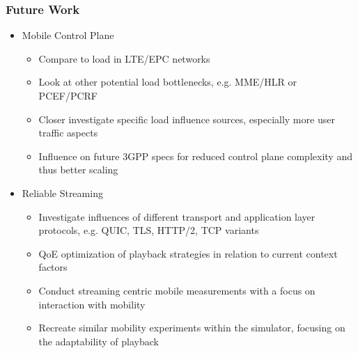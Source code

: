 \documentclass{beamer}
\begin{document}
\begin{frame}
	\frametitle{Future Work}

	\begin{itemize}
		\item Mobile Control Plane
			\begin{itemize}
				\item Compare to load in LTE/EPC networks
				\item Look at other potential load bottlenecks, e.g. MME/HLR or PCEF/PCRF
				\item Closer investigate specific load influence sources, especially more user traffic aspects
				\item Influence on future 3GPP specs for reduced control plane complexity and thus better scaling
			\end{itemize}
		\item Reliable Streaming
		\begin{itemize}
			\item Investigate influences of different transport and application layer protocols, e.g. QUIC, TLS, HTTP/2, TCP variants
			\item QoE optimization of playback strategies in relation to current context factors
			\item Conduct streaming centric mobile measurements with a focus on interaction with mobility
			\item Recreate similar mobility experiments within the simulator, focusing on the adaptability of playback 
		\end{itemize}
	\end{itemize}

\end{frame}



\end{document}

